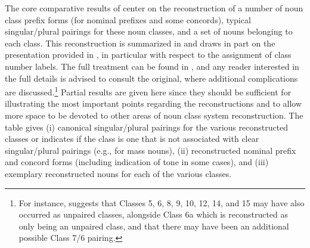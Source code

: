\documentclass[output=paper ,collection	  ,collectionchapter ,biblatexbackend=biber   ]{langscibook}
\begin{document}
The core comparative results of  center on the
reconstruction of a number of noun class prefix forms (for nominal prefixes and
some concords), typical singular/plural pairings for these noun classes, and a
set of nouns belonging to each class. This reconstruction is summarized in
 and draws in part on the presentation provided in
, in particular with respect to the
assignment of class number labels. The full treatment can be found in
, and any reader interested in the full details is
advised to consult the original, where additional complications are
discussed.{\footnote{For instance,  suggests that
Classes 5, 6, 8, 9, 10, 12, 14, and 15 may have also occurred as unpaired
classes, alongside Class 6a which is reconstructed as only being an unpaired
class, and that there may have been an additional possible Class 7/6 pairing.}}
Partial results are given here since they should be sufficient for illustrating
the most important points regarding the reconstructions and to allow more space
to be devoted to other areas of  noun class system
reconstruction. The table gives (i) canonical singular/plural pairings for the
various reconstructed classes or indicates if the class is one that is not
associated with clear singular/plural pairings (e.g., for mass nouns), (ii)
reconstructed nominal prefix and concord forms (including indication of tone in
some cases), and (iii) exemplary reconstructed nouns for each of the various
classes.
\end{document}
